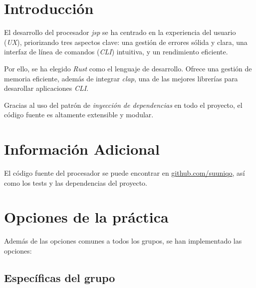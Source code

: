 \documentclass[a4paper]{CSMakotoTechnicalReport}
\begin{document}
\begin{multicols}{2} %


    \tableofcontents


    \section{Introducción}

    El desarrollo del procesador \textit{jsp} se ha centrado en la experiencia del usuario (\textit{UX}), priorizando tres aspectos clave: una gestión de errores sólida y clara, una interfaz de línea de comandos (\textit{CLI}) intuitiva, y un rendimiento eficiente.

    Por ello, se ha elegido \textit{Rust} como el lenguaje de desarrollo. Ofrece una gestión de memoria eficiente, además de integrar \textit{clap}, una de las mejores librerías para desarollar aplicaciones \textit{CLI}.

    Gracias al uso del patrón de \textit{inyección de dependencias} en todo el proyecto, el código fuente es altamente extensible y modular.

    \section{Información Adicional}

    El código fuente del procesador se puede encontrar en \href{https://www.github.com/suuniqo}{github.com/suuniqo}, así como los tests y las dependencias del proyecto.

    \section{Opciones de la práctica}

    Además de las opciones comunes a todos los grupos, se han implementado las opciones:

    \subsection{Específicas del grupo}


\end{multicols}
\end{document}
